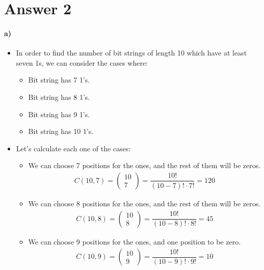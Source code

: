 \documentclass[12pt]{article}
\begin{document}
\section*{Answer 2}
\paragraph*{a)}
\begin{itemize}
 \item In order to find the number of bit strings of length 10 which have at least seven 1s, we can consider the cases where:
 \begin{itemize}
  \item Bit string has 7 1's.
  \item Bit string has 8 1's.
  \item Bit string has 9 1's.
  \item Bit string has 10 1's.
 \end{itemize}
\item Let's calculate each one of the cases:
 \begin{itemize}
  \item We can choose 7 positions for the ones, and the rest of them will be zeros.
  \begin{equation*}
   \begin{split}
   C(10, 7) = \begin{pmatrix} 10 \\ 7 \end{pmatrix} = \dfrac{10!}{(10-7)! \cdot 7!} = 120
   \end{split}
  \end{equation*}
  \item We can choose 8 positions for the ones, and the rest of them will be zeros.
  \begin{equation*}
   \begin{split}
   C(10, 8) = \begin{pmatrix} 10 \\ 8 \end{pmatrix} = \dfrac{10!}{(10-8)! \cdot 8!} = 45
   \end{split}
  \end{equation*}
  \item We can choose 9 positions for the ones, and one position to be zero.
  \begin{equation*}
   \begin{split}
   C(10, 9) = \begin{pmatrix} 10 \\ 9 \end{pmatrix} = \dfrac{10!}{(10-9)! \cdot 9!} = 10

\end{split}
\end{equation*}
\end{itemize}
\end{itemize}
\end{document}
